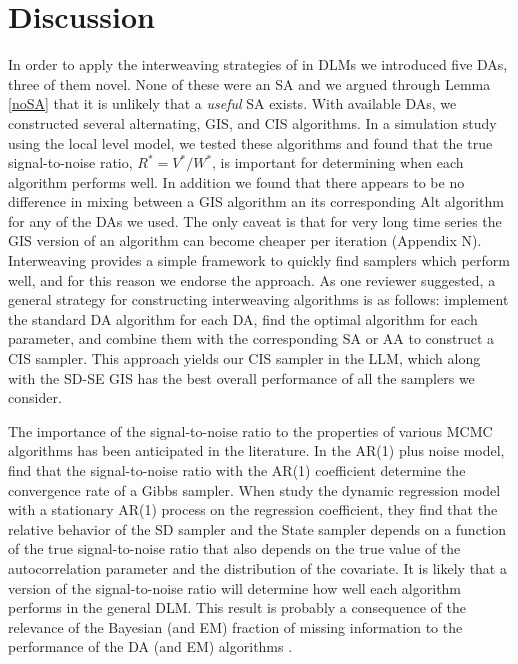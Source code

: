 \documentclass[12pt]{article}
\begin{document}
\section{Discussion}\label{sec:Discuss}
In order to apply the interweaving strategies of \citet{yu2011center} in DLMs we introduced five DAs, three of them novel. None of these were an SA and we argued through Lemma \ref{noSA} that it is unlikely that a {\it useful} SA exists. With available DAs, we constructed several alternating, GIS, and CIS algorithms. In a simulation study using the local level model, we tested these algorithms and found that the true signal-to-noise ratio, $R^*=V^*/W^*$, is important for determining when each algorithm performs well. In addition we found that there appears to be no difference in mixing between a GIS algorithm an its corresponding Alt algorithm for any of the DAs we used. The only caveat is that for very long time series the GIS version of an algorithm can become cheaper per iteration (Appendix N). Interweaving provides a simple framework to quickly find samplers which perform well, and for this reason we endorse the approach. As one reviewer suggested, a general strategy for constructing interweaving algorithms is as follows: implement the standard DA algorithm for each DA, find the optimal algorithm for each parameter, and combine them with the corresponding SA or AA to construct a CIS sampler. This approach yields our CIS sampler in the LLM, which along with the SD-SE GIS has the best overall performance of all the samplers we consider.

The importance of the signal-to-noise ratio to the properties of various MCMC algorithms has been anticipated in the literature. In the AR(1) plus noise model, \citet{pitt1999analytic} find that the signal-to-noise ratio with the AR(1) coefficient determine the convergence rate of a Gibbs sampler. When \citet{fruhwirth2004efficient} study the dynamic regression model with a stationary AR(1) process on the regression coefficient, they find that the relative behavior of the SD sampler and the State sampler depends on a function of the true signal-to-noise ratio that also depends on the true value of the autocorrelation parameter and the distribution of the covariate. It is likely that a version of the signal-to-noise ratio will determine how well each algorithm performs in the general DLM. This result is probably a consequence of the relevance of the Bayesian (and EM) fraction of missing information to the performance of the DA (and EM) algorithms \citep{van2001art}.
\end{document}
